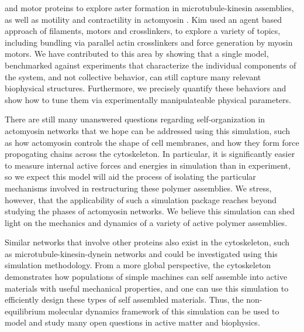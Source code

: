 \documentclass[12pt]{article}
\begin{document}
and motor proteins to explore aster formation in microtubule-kinesin assemblies,
as well as motility and contractility in actomyosin
\cite{nedelec2002,nedelec2007,ennomani2016}. 
Kim used an agent based approach of filaments, motors and crosslinkers, to
explore a variety of topics, including bundling via parallel actin crosslinkers 
and force generation by myosin motors\cite{kim2009b, kim2014}. We have
contributed to this area by showing that a single model, benchmarked against
experiments that characterize the individual components of the system, and not
collective behavior\cite{freedman2016}, can still capture many relevant 
biophysical structures. Furthermore, we precisely quantify these behaviors 
and show how to tune them via experimentally manipulateable physical parameters. 
\par 
There are still many unanswered questions regarding self-organization in
actomyosin networks that we hope can be addressed using this simulation, such as
how actomyosin controls the shape of cell membranes, and how they form force
propogating chains across the cytoskeleton\cite{fraley2005,dasanyake2011}. 
In particular, it is significantly easier to measure internal active forces and
energies in simulation than in experiment, so we expect this model will aid the
process of isolating the particular mechanisms involved in restructuring these
polymer assemblies. We stress, however, that the applicability of such a
simulation package reaches beyond studying the phases of actomyosin networks.  
We believe this simulation can shed light on the mechanics and dynamics of 
a variety of active polymer assemblies.
\par
Similar networks that involve other proteins also exist in the
cytoskeleton, such as microtubule-kinesin-dynein networks and could be
investigated using this simulation methodology. From a more global perspective, 
the cytoskeleton
demonstrates how populations of simple machines can self assemble into active
materials with useful mechanical properties, and one can use this simulation to
efficiently design these types of self assembled materials. Thus, the
non-equilibrium molecular dynamics framework of this simulation can be used to
model and study many open questions in active matter and biophysics.
\end{document}
